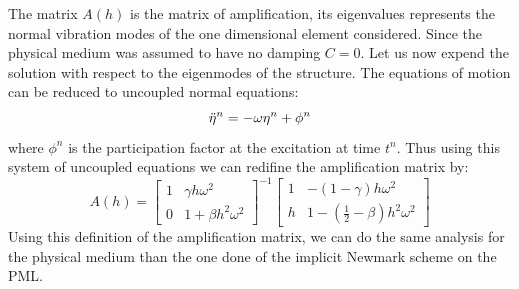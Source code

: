 The matrix $A(h)$ is the matrix of amplification, its eigenvalues represents the normal vibration modes of the one dimensional element considered. Since the physical medium was assumed to have no damping $C=0$. Let us now expend the solution with respect to the eigenmodes of the structure. The equations of motion can be reduced to uncoupled normal equations:
\begin{equation}
    \Ddot{\eta}^n = - \omega \eta^n+\phi^n
\end{equation}
where $\phi^n$ is the participation factor at the excitation at time $t^n$. Thus using this system of uncoupled equations we can redifine the amplification matrix by:
\begin{equation}
    A(h) = \begin{bmatrix} 1& \gamma h \omega^2\\ 0&1+\beta h^2 \omega ^2\end{bmatrix}^{-1} \begin{bmatrix} 1& -(1-\gamma) h \omega^2\\ h&1-(\frac{1}{2}-\beta) h^2 \omega ^2\end{bmatrix}
\end{equation}
Using this definition of the amplification matrix, we can do the same analysis for the physical medium than the one done of the implicit Newmark scheme on the PML.
